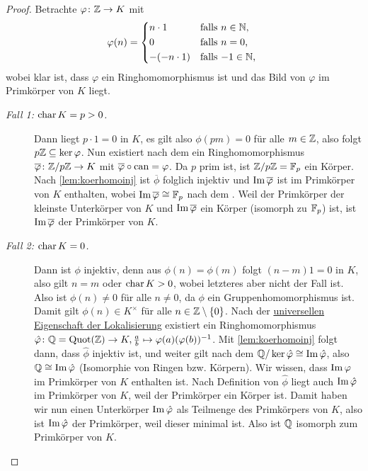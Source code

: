 \documentclass[12pt,a4paper]{scrartcl}
\begin{document}
\begin{proof}
	Betrachte $\varphi\colon \mathbb Z\to K$ mit 
	\[
		\phi(n) = \begin{cases*}
		n \cdot 1 & falls $n \in \IN$,\\
		0 & falls $n=0$,\\
		-(-n\cdot 1) & falls $-1 \in \IN$,
		\end{cases*}
	\]
	wobei klar ist, dass $\varphi$ ein Ringhomomorphismus ist und das Bild von $\varphi$ im Primkörper von $K$ liegt.
	
	\begin{description}
		\item[\emph{Fall 1: $\operatorname{char} K = p > 0$.}] Dann liegt $p\cdot 1  = 0$ in $K$, es gilt also $\phi(pm) = 0$ für alle $m\in\mathbb Z$, also folgt $p\mathbb Z\subseteq \operatorname{ker} \varphi$. Nun existiert nach dem  ein Ringhomomorphismus $\overline{\varphi}\colon \mathbb Z/p\mathbb Z\to K$ mit $\overline{\varphi}\circ \operatorname{can}  = \varphi$. Da $p$ prim ist, ist $\mathbb Z/p\mathbb Z = \mathbb F_p$ ein Körper. Nach \cref{lem:koerhomoinj} ist $\overline{\phi}$ folglich injektiv und $\operatorname{Im}\overline{\varphi}$ ist im Primkörper von $K$ enthalten, wobei $\operatorname{Im}\overline{\varphi} \cong \mathbb F_p$ nach dem . Weil der Primkörper der kleinste Unterkörper von $K$ und $\operatorname{Im}\overline{\varphi}$ ein Körper (isomorph zu $\mathbb F_p$) ist, ist $\operatorname{Im} \overline {\varphi}$ der Primkörper von $K$.
		\item[\emph{Fall 2: $\operatorname{char} K = 0$.}] Dann ist $\phi$ injektiv, denn aus $\phi(n) = \phi(m)$ folgt $(n-m)1 = 0$ in $K$, also gilt $n = m$ oder  $\operatorname{char} K > 0$, wobei letzteres aber nicht der Fall ist. Also ist $\phi(n) \neq 0$ für alle $n\neq 0$, da $\phi$ ein Gruppenhomomorphismus ist. Damit gilt $\phi(n)\in K^{\times}$ für alle $n \in \mathbb Z\setminus\{0\}$. Nach der \hyperref[thm:unieig_lokali]{universellen Eigenschaft der Lokalisierung} existiert ein Ringhomomorphismus $\hat{\varphi}\colon \mathbb Q= \operatorname{Quot} (\mathbb Z)\to K, \frac ab \mapsto \varphi(a)(\varphi(b))^{-1}$. Mit \cref{lem:koerhomoinj} folgt dann, dass $\hat{\phi}$ injektiv ist, und weiter gilt nach dem  $\mathbb Q/\operatorname{ker}\hat{\varphi} \cong \operatorname{Im}\hat{\varphi}$, also $\mathbb Q \cong \operatorname{Im} \hat{\varphi}$ (Isomorphie von Ringen bzw. Körpern). Wir wissen, dass $\operatorname{Im} \varphi$ im Primkörper von $K$ enthalten ist. Nach Definition von $\hat{\phi}$ liegt auch $\operatorname{Im}\hat{\varphi}$ im Primkörper von $K$, weil der Primkörper ein Körper ist. Damit haben wir nun einen Unterkörper $\operatorname{Im} \hat{\varphi}$ als Teilmenge des Primkörpers von $K$, also ist $\operatorname{Im} \hat{\varphi}$ der Primkörper, weil dieser minimal ist. Also ist $\mathbb Q$ isomorph zum Primkörper von $K$.
	\end{description}
\end{proof}
\end{document}

